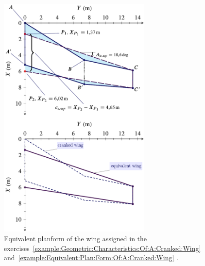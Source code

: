 \documentclass[[12pt,twoside]{book}
\begin{document}
\begin{figure}[t]%
  \centering
    \includegraphics[width=0.68\textwidth]{Chapter_2/equivalent_plan_form_of_a_cranked_wing/wing_planform_basic_3_drawing.pdf}
  \caption{
           Equivalent planform of the wing assigned in the exercises~\ref{example:Geometric:Characteristics:Of:A:Cranked:Wing} and~\ref{example:Equivalent:Plan:Form:Of:A:Cranked:Wing} .
  }
  \label{fig:Cranked:Wing:Planform:Results:B}%
\end{figure}
%

%
\end{document}
